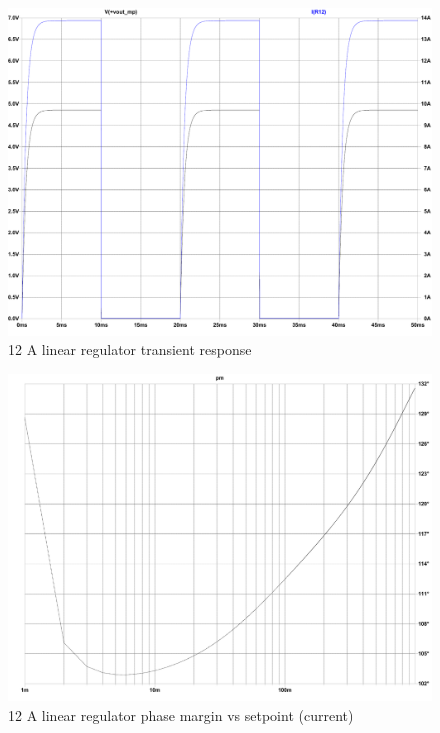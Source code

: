 \begin{figure}[h!]
    \centering
    \includegraphics[scale=0.25]{LT3080-1_Transient-response.pdf}
    \caption{12 A linear regulator transient response}
    \label{fig:LT3080-1_Transient-response}
\end{figure}

\begin{figure}[h!]
    \centering
    \includegraphics[scale=0.25]{LT3080-1_Phase-margin_VS_setpoint.pdf}
    \caption{12 A linear regulator phase margin vs setpoint (current)}
    \label{fig:LT3080-1_Phase-margin_VS_setpoint}
\end{figure}

